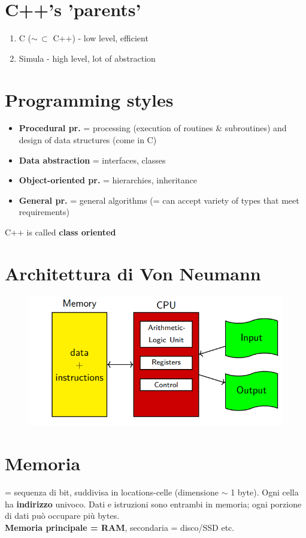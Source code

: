 \documentclass[10pt, oneside]{book}
\begin{document}
\section{C++'s 'parents'}
\begin{enumerate}
\item C ($\sim \, \subset$ C++) - low level, efficient
\item Simula - high level, lot of abstraction
\end{enumerate}

\section{Programming styles}
\begin{itemize}
\item \textbf{Procedural pr.} = processing (execution of routines \& subroutines) and design of data structures (come in C)
\item \textbf{Data abstraction} = interfaces, classes
\item \textbf{Object-oriented pr.} = hierarchies, inheritance
\item \textbf{General pr.} = general algorithms (= can accept variety of types that meet requirements)
\end{itemize}
C++ is called \textbf{class oriented}


\section{Architettura di Von Neumann}
\begin{figure}[h!]
\centering
\includegraphics[scale=0.8]{von_neumann.png}
\end{figure}

\section{Memoria}
= sequenza di bit, suddivisa in locations-celle (dimensione $\sim$ 1 byte). Ogni cella ha \textbf{indirizzo} univoco. Dati e istruzioni sono entrambi in memoria; ogni porzione di dati può occupare più bytes.\\
\textbf{Memoria principale = RAM}, secondaria = disco/SSD etc.
\end{document}
